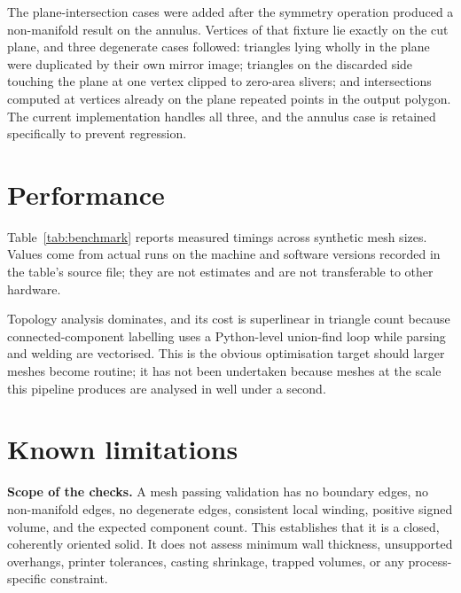 \documentclass[11pt, a4paper]{article}
\begin{document}
The plane-intersection cases were added after the symmetry operation produced a
non-manifold result on the annulus. Vertices of that fixture lie exactly on the
cut plane, and three degenerate cases followed: triangles lying wholly in the
plane were duplicated by their own mirror image; triangles on the discarded
side touching the plane at one vertex clipped to zero-area slivers; and
intersections computed at vertices already on the plane repeated points in the
output polygon. The current implementation handles all three, and the annulus
case is retained specifically to prevent regression.

\section{Performance}

Table~\ref{tab:benchmark} reports measured timings across synthetic mesh sizes.
Values come from actual runs on the machine and software versions recorded in
the table's source file; they are not estimates and are not transferable to
other hardware.

\begin{table}[h]
  \centering
  \small
  
  \caption{Measured cost of parsing, welding and topology analysis. Median of
  five runs per configuration.}
  \label{tab:benchmark}
\end{table}

Topology analysis dominates, and its cost is superlinear in triangle count
because connected-component labelling uses a Python-level union-find loop while
parsing and welding are vectorised. This is the obvious optimisation target
should larger meshes become routine; it has not been undertaken because meshes
at the scale this pipeline produces are analysed in well under a second.

\section{Known limitations}

\textbf{Scope of the checks.} A mesh passing validation has no boundary edges,
no non-manifold edges, no degenerate edges, consistent local winding, positive
signed volume, and the expected component count. This establishes that it is a
closed, coherently oriented solid. It does not assess minimum wall thickness,
unsupported overhangs, printer tolerances, casting shrinkage, trapped volumes,
or any process-specific constraint.
\end{document}
